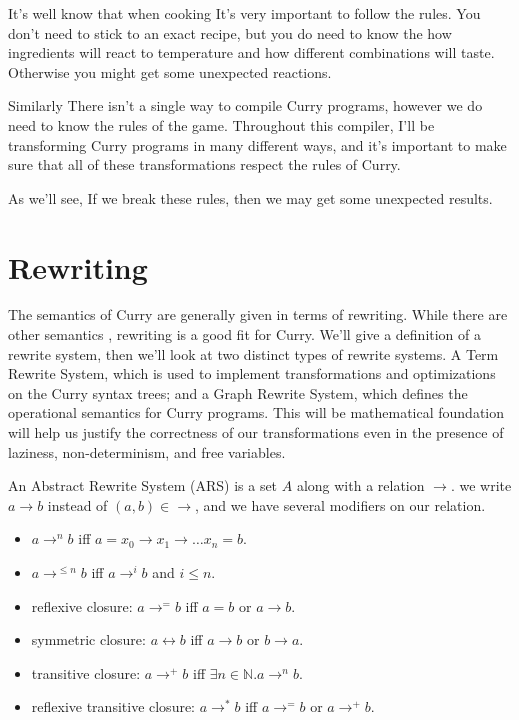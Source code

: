 \documentclass{article}
\def\N{\mathbb{N}}
\begin{document}
It's well know that when cooking It's very important to follow the rules.
You don't need to stick to an exact recipe, 
but you do need to know the how ingredients will react to temperature
and how different combinations will taste.
Otherwise you might get some unexpected reactions.

Similarly There isn't a single way to compile Curry programs,
however we do need to know the rules of the game.
Throughout this compiler, I'll be transforming Curry programs
in many different ways, and it's important to make sure that all
of these transformations respect the rules of Curry.

As we'll see, If we break these rules, 
then we may get some unexpected results.

\section{Rewriting}
The semantics of Curry are generally given in terms of rewriting.
\cite{?}
While there are other semantics \cite{?}, 
rewriting is a good fit for Curry.
We'll give a definition of a rewrite system,
then we'll look at two distinct types of rewrite systems.
A Term Rewrite System, which is used to implement transformations and optimizations
on the Curry syntax trees;
and a Graph Rewrite System, which defines the operational semantics for Curry programs.
This will be mathematical foundation will help us justify the correctness of our transformations
even in the presence of laziness, non-determinism, and free variables.

An Abstract Rewrite System (ARS) is a set $A$ along with a relation $\rightarrow$.
we write $a \rightarrow b$ instead of $(a,b) \in \rightarrow$, and we have several modifiers on our relation.
\begin{itemize}
    \item $a \rightarrow^n b$ iff $a = x_0 \rightarrow x_1 \rightarrow \ldots x_n = b$.
    \item $a \rightarrow^{\le n} b$ iff $a \rightarrow^i b$ and $i \leq n$.
    \item reflexive closure: $a \rightarrow^= b$ iff $a = b$ or $a \rightarrow b$.
    \item symmetric closure: $a \leftrightarrow b$ iff $a \rightarrow b$ or $b \rightarrow a$.
    \item transitive closure: $a \rightarrow^+ b$ iff $\exists n\in \N. a \rightarrow^n b$.
    \item reflexive transitive closure: $a \rightarrow^* b$ iff $a \rightarrow^= b$ or $a \rightarrow^+ b$.
\end{itemize}
\end{document}
